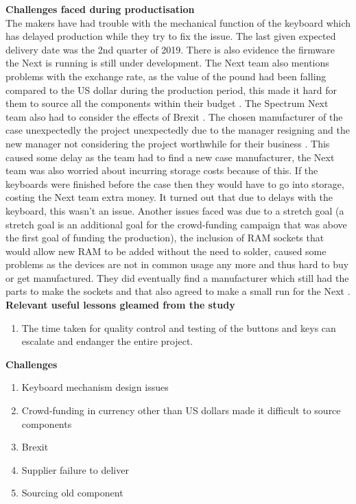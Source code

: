 \textbf{Challenges faced during productisation}\\
The makers have had trouble with the mechanical function of the keyboard which has delayed production while they try to fix the issue. The last given expected delivery date was the 2nd quarter of 2019. There is also evidence the firmware the Next is running is still under development. The Next team also mentions problems with the exchange rate, as the value of the pound had been falling compared to the US dollar during the production period, this made it hard for them to source all the components within their budget 
\cite{RN159}. The Spectrum Next team also had to consider the effects of Brexit 
\cite{RN157}. The chosen manufacturer of the case unexpectedly the project unexpectedly due to the manager resigning and the new manager not considering the project worthwhile for their business 
\cite{RN158}. This caused some delay as the team had to find a new case manufacturer, the Next team was also worried about incurring storage costs because of this. If the keyboards were finished before the case then they would have to go into storage, costing the Next team extra money. It turned out that due to delays with the keyboard, this wasn't an issue. Another issues faced was due to a stretch goal (a stretch goal is an additional goal for the crowd-funding campaign that was above the first goal of funding the production), the inclusion of RAM sockets that would allow new RAM to be added without the need to solder, caused some problems as the devices are not in common usage any more and thus hard to buy or get manufactured. They did eventually find a manufacturer which still had the parts to make the sockets and that also agreed to make a small run for the Next 
\cite{RN159}. \\

\textbf{Relevant useful lessons gleamed from the study}
\begin{enumerate}
\item The time taken for quality control and testing of the buttons and keys can escalate and endanger the entire project.\\
\end{enumerate}

\textbf{Challenges}
\begin{enumerate}
\item Keyboard mechanism design issues
\item Crowd-funding in currency other than US dollars made it difficult to source components
\item Brexit
\item Supplier failure to deliver
\item Sourcing old component 
\end{enumerate}

